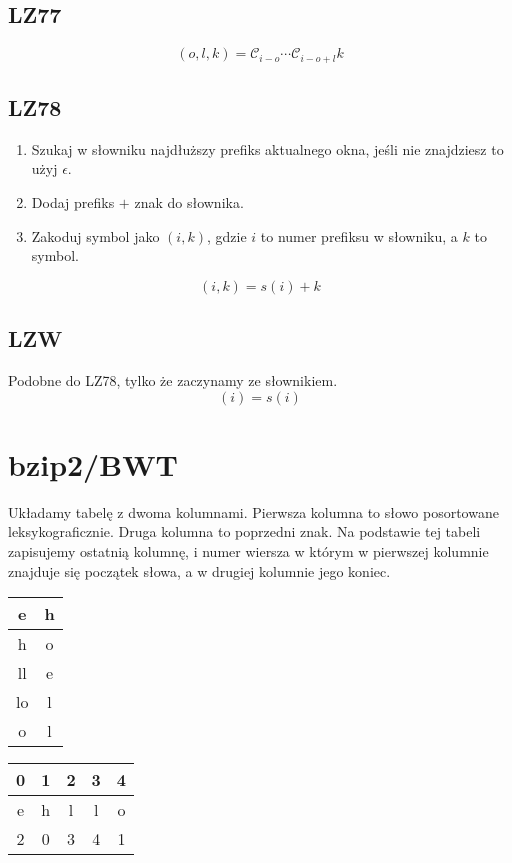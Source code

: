 \documentclass{../notatki}
\begin{document}
\begin{multicols}{2}
  \subsection{LZ77}

  $$
  (o, l, k) = \mathcal{C}_{i - o} \cdots \mathcal{C}_{i - o + l} k
  $$

  \subsection{LZ78}

  \begin{enumerate}
    \item Szukaj w słowniku najdłuższy prefiks aktualnego okna, jeśli
      nie znajdziesz to użyj $\epsilon$.
    \item Dodaj prefiks $+$ znak do słownika.
    \item Zakoduj symbol jako $(i, k)$, gdzie $i$ to numer
      prefiksu w słowniku, a $k$ to symbol.
  \end{enumerate}

  $$
  (i, k) = s(i) + k
  $$

  \subsection{LZW}

  Podobne do LZ78, tylko że zaczynamy ze słownikiem.
  $$
  (i) = s(i)
  $$

  \section{bzip2/BWT}

  Układamy tabelę z dwoma kolumnami. Pierwsza kolumna to słowo posortowane
  leksykograficznie. Druga kolumna to poprzedni znak. Na podstawie tej tabeli
  zapisujemy ostatnią kolumnę, i numer wiersza w którym w pierwszej kolumnie
  znajduje się początek słowa, a w drugiej kolumnie jego koniec.

  \begin{center}

    \begin{tabular}{|c|c|}
      \hline
      e & h \\
      \hline
      \rowcolor{gray!50}
      h & o \\
      \hline
      ll & e \\
      \hline
      lo & l \\
      \hline
      o & l \\
      \hline
    \end{tabular}
    \begin{tabular}{|c|c|c|c|c|}
      \hline
      \rowcolor{gray!50}
      0 & 1 & 2 & 3 & 4 \\
      \hline
      e & h & l & l & o \\
      \hline
      2 & 0 & 3 & 4 & 1 \\
      \hline
    \end{tabular}
  \end{center}


\end{multicols}
\end{document}
